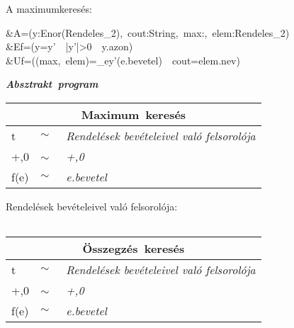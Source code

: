 \documentclass[12pt,a4paper]{article}			%
\newcommand{\fejezet}[1]{\noindent \textbf{\textit{\large #1 \vspace{5mm}}}}
\begin{document}
	A maximumkeresés:
	\begin{flalign*}
	&A=(y:Enor(Rendeles_2),~cout:String,~max:,~elem:Rendeles_2)\\
	&Ef=(y=y'~\wedge~|y'|>0~\wedge~y.azon\uparrow)\\
	&Uf=((max,~elem)=\max_{e\in y'}{(e.bevetel)}~\wedge~cout=elem.nev)
	\end{flalign*}
	\newpage
	\fejezet{Absztrakt~program}\\
	\begin{center}
	\begin{tabular}{|lll|}
		\hline
		\multicolumn{3}{|c|}{\textbf{Maximum~keresés}}\\
		\hline
		t & $\sim$ & \textit{Rendelések bevételeivel való felsorolója}\\
		+,0 & $\sim$~ & \textit{+,0}\\
		f(e) & $\sim$ & \textit{e.bevetel}\\
		\hline
	\end{tabular}

	\noindent\hfill
		\begin{stuki}[12cm]
			\begin{WHILE}{4}{}
				\begin{IF}[70]{2}{}
				\ELSE
				\end{IF}
			\end{WHILE}
		\end{stuki}
		\vspace{5mm}
	Rendelések bevételeivel való felsorolója:
	\begin{tabular}{|l|l|}
	
	\end{tabular}

	\begin{tabular}{|lll|}
		\hline
		\multicolumn{3}{|c|}{\textbf{Összegzés~keresés}}\\
		\hline
		t & $\sim$ & \textit{Rendelések bevételeivel való felsorolója}\\
		+,0 & $\sim$~ & \textit{+,0}\\
		f(e) & $\sim$ & \textit{e.bevetel}\\
		\hline
	\end{tabular}
	\end{center}
\end{document}
